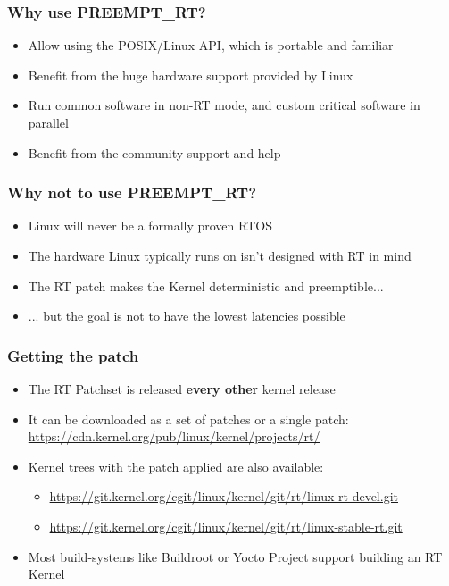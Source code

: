 \begin{frame}
        \frametitle{Why use PREEMPT\_RT?}
        \begin{itemize}
                \item Allow using the POSIX/Linux API, which is portable and familiar
                \item Benefit from the huge hardware support provided by Linux
                \item Run common software in non-RT mode, and custom critical software in parallel
                \item Benefit from the community support and help
        \end{itemize}
\end{frame}

\begin{frame}
        \frametitle{Why not to use PREEMPT\_RT?}
        \begin{itemize}
                \item Linux will never be a formally proven RTOS
                \item The hardware Linux typically runs on isn't designed with RT in mind
                \item The RT patch makes the Kernel deterministic and preemptible...
                \item ... but the goal is not to have the lowest latencies possible
        \end{itemize}
\end{frame}

\begin{frame}
  \frametitle{Getting the patch}
        \begin{itemize}
                \item The RT Patchset is released \textbf{every other} kernel release
                \item It can be downloaded as a set of patches or a single patch: \\
                        \url{https://cdn.kernel.org/pub/linux/kernel/projects/rt/}
                \item Kernel trees with the patch applied are also available:
                        \begin{itemize}
                                \item \url{https://git.kernel.org/cgit/linux/kernel/git/rt/linux-rt-devel.git}
                                \item \url{https://git.kernel.org/cgit/linux/kernel/git/rt/linux-stable-rt.git}
                        \end{itemize}
                \item Most build-systems like Buildroot or Yocto Project support building an RT Kernel
        \end{itemize}
\end{frame}

